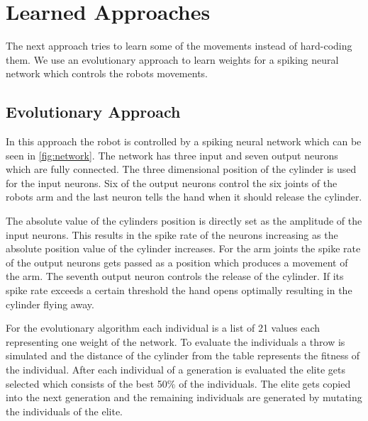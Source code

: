 \section{Learned Approaches}
\label{sec:learned}
The next approach tries to learn some of the movements instead of hard-coding them.
We use an evolutionary approach to learn weights for a spiking neural network which controls the robots movements.

\subsection{Evolutionary Approach}
In this approach the robot is controlled by a spiking neural network which can be seen in \autoref{fig:network}.
The network has three input and seven output neurons which are fully connected.
The three dimensional position of the cylinder is used for the input neurons.
Six of the output neurons control the six joints of the robots arm and the last neuron tells the hand when it should release the cylinder.

The absolute value of the cylinders position is directly set as the amplitude of the input neurons.
This results in the spike rate of the neurons increasing as the absolute position value of the cylinder increases.
For the arm joints the spike rate of the output neurons gets passed as a position which produces a movement of the arm.
The seventh output neuron controls the release of the cylinder.
If its spike rate exceeds a certain threshold the hand opens optimally resulting in the cylinder flying away.

For the evolutionary algorithm each individual is a list of 21 values each representing one weight of the network.
To evaluate the individuals a throw is simulated and the distance of the cylinder from the table represents the fitness of the individual.
After each individual of a generation is evaluated the elite gets selected which consists of the best 50\% of the individuals.
The elite gets copied into the next generation and the remaining individuals are generated by mutating the individuals of the elite.

